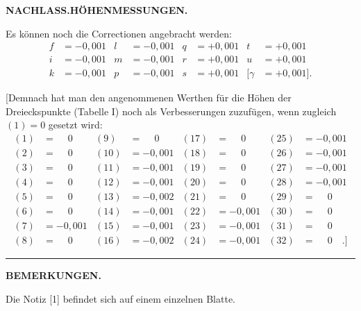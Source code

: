 \par\clearpage
\noindent{}\hfill{\small\textbf{NACHLASS.\quad HÖHENMESSUNGEN.}}\hfill\null\par\medskip
\par\noindent\hspace*{\parindent}Es können noch die Correctionen angebracht werden:
\[
\begin{aligned}
f&=-0{,}001 & l&=-0{,}001 & q&=+0{,}001 & t&=+0{,}001\\
i&=-0{,}001 & m&=-0{,}001 & r&=+0{,}001 & u&=+0{,}001\\
k&=-0{,}001 & p&=-0{,}001 & s&=+0{,}001 & [\gamma&=+0{,}001].
\end{aligned}
\]
\par\noindent\hspace*{\parindent}[Demnach hat man den angenommenen Werthen für die Höhen der
Dreieckspunkte (Tabelle I) noch als Verbesserungen zuzufügen, wenn zugleich
\((1)=0\) gesetzt wird:
\[
\begin{aligned}
(1)&=\phantom{-}0 & (9)&=\phantom{-}0 & (17)&=\phantom{-}0 & (25)&=-0{,}001\\
(2)&=\phantom{-}0 & (10)&=-0{,}001 & (18)&=\phantom{-}0 & (26)&=-0{,}001\\
(3)&=\phantom{-}0 & (11)&=-0{,}001 & (19)&=\phantom{-}0 & (27)&=-0{,}001\\
(4)&=\phantom{-}0 & (12)&=-0{,}001 & (20)&=\phantom{-}0 & (28)&=-0{,}001\\
(5)&=\phantom{-}0 & (13)&=-0{,}002 & (21)&=\phantom{-}0 & (29)&=\phantom{-}0\\
(6)&=\phantom{-}0 & (14)&=-0{,}001 & (22)&=-0{,}001 & (30)&=\phantom{-}0\\
(7)&=-0{,}001 & (15)&=-0{,}001 & (23)&=-0{,}001 & (31)&=\phantom{-}0\\
(8)&=\phantom{-}0 & (16)&=-0{,}002 & (24)&=-0{,}001 & (32)&=\phantom{-}0\quad.]
\end{aligned}
\]
\par\medskip
\begin{center}\rule{.18\linewidth}{.4pt}\end{center}
\par\bigskip
\begin{center}\small\textbf{BEMERKUNGEN.}\end{center}
\begingroup
\footnotesize
\setlength{\abovedisplayskip}{5pt}\setlength{\belowdisplayskip}{5pt}
\par\noindent\hspace*{\parindent}Die Notiz [1] befindet sich auf einem einzelnen Blatte.
